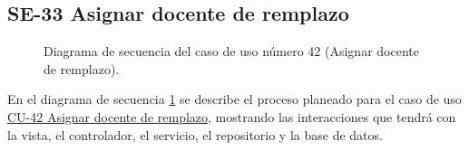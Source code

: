 \subsection{SE-33 Asignar docente de remplazo}

\begin{figure}[htbp!]
	\begin{center}
		\caption{Diagrama de secuencia del caso de uso número 42 (Asignar docente de remplazo).}
		\label{fig:Diagrama de secuencia CU-42}
	\end{center}
\end{figure}

En el diagrama de secuencia \ref{fig:Diagrama de secuencia CU-42} se describe el proceso planeado para el caso de uso \hyperlink{CU-42}{CU-42 Asignar docente de remplazo}, mostrando las interacciones que tendrá con la vista, el controlador, el servicio, el repositorio y la base de datos.
